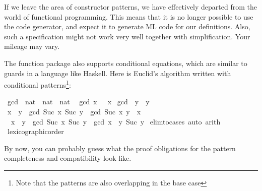 \begin{isabellebody}
\begin{isamarkuptext}
  If we leave the area of constructor
  patterns, we have effectively departed from the world of functional
  programming. This means that it is no longer possible to use the
  code generator, and expect it to generate ML code for our
  definitions. Also, such a specification might not work very well together with
  simplification. Your mileage may vary.%
\end{isamarkuptext}%
\isamarkuptrue%
%
\isamarkuptrue%
%
\begin{isamarkuptext}%
The function package also supports conditional equations, which are
  similar to guards in a language like Haskell. Here is Euclid's
  algorithm written with conditional patterns\footnote{Note that the
  patterns are also overlapping in the base case}:%
\end{isamarkuptext}%
\isamarkuptrue%
\isamarkupfalse%
\ gcd\ {\isacharcolon}{\isacharcolon}\ {\isachardoublequoteopen}nat\ {\isasymRightarrow}\ nat\ {\isasymRightarrow}\ nat{\isachardoublequoteclose}\isanewline
{}\isanewline
\ \ {\isachardoublequoteopen}gcd\ x\ {}\ {\isacharequal}\ x{\isachardoublequoteclose}\isanewline
{\isacharbar}\ {\isachardoublequoteopen}gcd\ {}\ y\ {\isacharequal}\ y{\isachardoublequoteclose}\isanewline
{\isacharbar}\ {\isachardoublequoteopen}x\ {\isacharless}\ y\ {\isasymLongrightarrow}\ gcd\ {\isacharparenleft}Suc\ x{\isacharparenright}\ {\isacharparenleft}Suc\ y{\isacharparenright}\ {\isacharequal}\ gcd\ {\isacharparenleft}Suc\ x{\isacharparenright}\ {\isacharparenleft}y\ {\isacharminus}\ x{\isacharparenright}{\isachardoublequoteclose}\isanewline
{\isacharbar}\ {\isachardoublequoteopen}{\isasymnot}\ x\ {\isacharless}\ y\ {\isasymLongrightarrow}\ gcd\ {\isacharparenleft}Suc\ x{\isacharparenright}\ {\isacharparenleft}Suc\ y{\isacharparenright}\ {\isacharequal}\ gcd\ {\isacharparenleft}x\ {\isacharminus}\ y{\isacharparenright}\ {\isacharparenleft}Suc\ y{\isacharparenright}{\isachardoublequoteclose}\isanewline
%
\isadelimproof
%
\endisadelimproof
%
\isatagproof
{}\isamarkupfalse%
\ {\isacharparenleft}elim{\isacharunderscore}to{\isacharunderscore}cases{\isacharcomma}\ auto{\isacharcomma}\ arith{\isacharparenright}%
\endisatagproof
{\isafoldproof}%
%
\isadelimproof
\isanewline
%
\endisadelimproof
{}\isamarkupfalse%
%
\isadelimproof
\ %
\endisadelimproof
%
\isatagproof
{}\isamarkupfalse%
\ lexicographic{\isacharunderscore}order%
\endisatagproof
{\isafoldproof}%
%
\isadelimproof
%
\endisadelimproof
%
\begin{isamarkuptext}%
By now, you can probably guess what the proof obligations for the
  pattern completeness and compatibility look like. 


\end{isamarkuptext}
\end{isabellebody}
